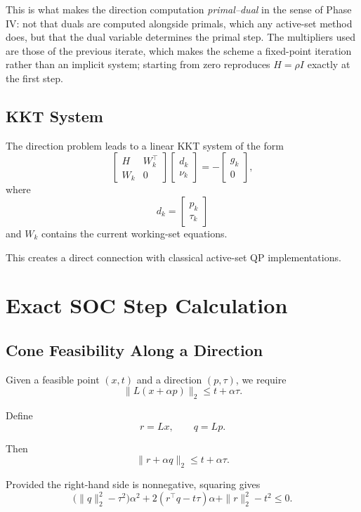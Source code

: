 \documentclass[11pt,a4paper]{article}
\begin{document}
This is what makes the direction computation \emph{primal--dual} in
the sense of Phase IV: not that duals are computed alongside primals,
which any active-set method does, but that the dual variable
determines the primal step. The multipliers used are those of the
previous iterate, which makes the scheme a fixed-point iteration
rather than an implicit system; starting from zero reproduces
$H=\rho I$ exactly at the first step.

\subsection{KKT System}

The direction problem leads to a linear KKT system of the form
\[
\begin{bmatrix}
H&W_k^\top\\
W_k&0
\end{bmatrix}
\begin{bmatrix}
d_k\\
\nu_k
\end{bmatrix}
=
-
\begin{bmatrix}
g_k\\
0
\end{bmatrix},
\]
where
\[
d_k=
\begin{bmatrix}
p_k\\
\tau_k
\end{bmatrix}
\]
and $W_k$ contains the current working-set equations.

This creates a direct connection with classical active-set QP
implementations.

\section{Exact SOC Step Calculation}

\subsection{Cone Feasibility Along a Direction}

Given a feasible point $(x,t)$ and a direction $(p,\tau)$, we require
\[
\|L(x+\alpha p)\|_2
\leq
t+\alpha\tau.
\tag{5}
\]

Define
\[
r=Lx,
\qquad
q=Lp.
\]

Then
\[
\|r+\alpha q\|_2
\leq
t+\alpha\tau.
\]

Provided the right-hand side is nonnegative, squaring gives
\begin{equation}
\bigl(\|q\|_2^2-\tau^2\bigr)\alpha^2
+
2(r^\top q-t\tau)\alpha
+
\|r\|_2^2-t^2
\leq0.
\tag{6}
\end{equation}
\end{document}
